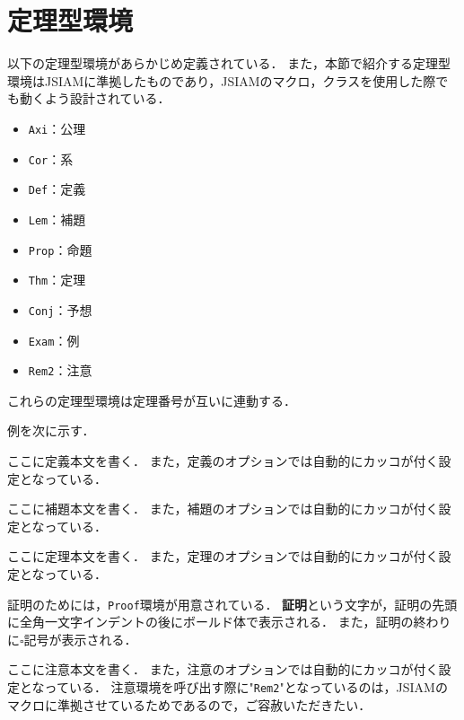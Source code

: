 \section{定理型環境}
以下の定理型環境があらかじめ定義されている．
また，本節で紹介する定理型環境はJSIAMに準拠したものであり，JSIAMのマクロ，クラスを使用した際でも動くよう設計されている．
\begin{itemize}
    \item \texttt{Axi}：公理
    \item \texttt{Cor}：系
    \item \texttt{Def}：定義
    \item \texttt{Lem}：補題
    \item \texttt{Prop}：命題
    \item \texttt{Thm}：定理
    \item \texttt{Conj}：予想
    \item \texttt{Exam}：例
    \item \texttt{Rem2}：注意
\end{itemize}
これらの定理型環境は定理番号が互いに連動する．

例を次に示す．
\begin{Def}[定義のオプション]
    ここに定義本文を書く．
    また，定義のオプションでは自動的にカッコが付く設定となっている．
\end{Def}

\begin{Lem}[補題のオプション]
    ここに補題本文を書く．
    また，補題のオプションでは自動的にカッコが付く設定となっている．
\end{Lem}

\begin{Thm}[定理のオプション]
    ここに定理本文を書く．
    また，定理のオプションでは自動的にカッコが付く設定となっている．
\end{Thm}

\begin{Proof}
    証明のためには，\texttt{Proof}環境が用意されている．
    \textbf{証明}という文字が，証明の先頭に全角一文字インデントの後にボールド体で表示される．
    また，証明の終わりに{\small $\square$}記号が表示される．
\end{Proof}

\begin{Rem2}[注意のオプション]
    ここに注意本文を書く．
    また，注意のオプションでは自動的にカッコが付く設定となっている．
    注意環境を呼び出す際に"\texttt{Rem2}"となっているのは，JSIAMのマクロに準拠させているためであるので，ご容赦いただきたい．
\end{Rem2}

